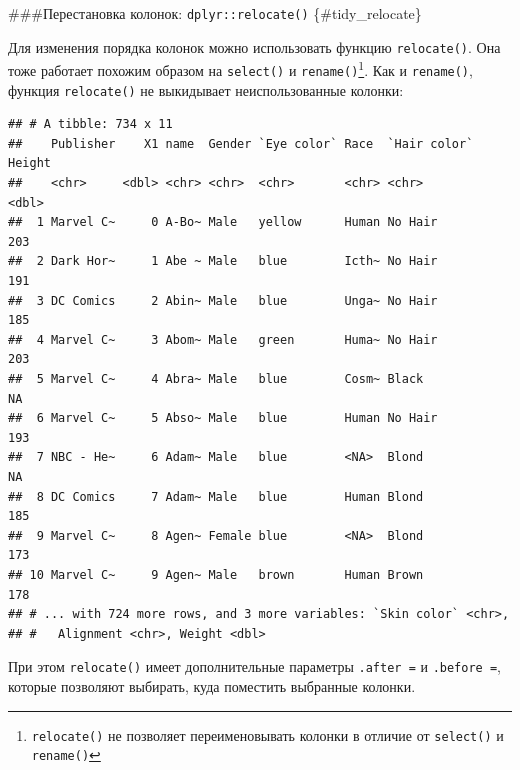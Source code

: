 \documentclass[
]{book}
\newenvironment{Shaded}{\begin{snugshade}}{\end{snugshade}}
\newcommand{\DataTypeTok}[1]{\textcolor[rgb]{0.13,0.29,0.53}{#1}}
\newcommand{\KeywordTok}[1]{\textcolor[rgb]{0.13,0.29,0.53}{\textbf{#1}}}
\newcommand{\NormalTok}[1]{#1}
\newcommand{\OperatorTok}[1]{\textcolor[rgb]{0.81,0.36,0.00}{\textbf{#1}}}
\newcommand{\StringTok}[1]{\textcolor[rgb]{0.31,0.60,0.02}{#1}}
\begin{document}
\#\#\#Перестановка колонок: \texttt{dplyr::relocate()} \{\#tidy\_relocate\}

Для изменения порядка колонок можно использовать функцию \texttt{relocate()}. Она тоже работает похожим образом на \texttt{select()} и \texttt{rename()}\footnote{\texttt{relocate()} не позволяет переименовывать колонки в отличие от \texttt{select()} и \texttt{rename()}}. Как и \texttt{rename()}, функция \texttt{relocate()} не выкидывает неиспользованные колонки:

\begin{Shaded}
\end{Shaded}

\begin{verbatim}
## # A tibble: 734 x 11
##    Publisher    X1 name  Gender `Eye color` Race  `Hair color` Height
##    <chr>     <dbl> <chr> <chr>  <chr>       <chr> <chr>         <dbl>
##  1 Marvel C~     0 A-Bo~ Male   yellow      Human No Hair         203
##  2 Dark Hor~     1 Abe ~ Male   blue        Icth~ No Hair         191
##  3 DC Comics     2 Abin~ Male   blue        Unga~ No Hair         185
##  4 Marvel C~     3 Abom~ Male   green       Huma~ No Hair         203
##  5 Marvel C~     4 Abra~ Male   blue        Cosm~ Black            NA
##  6 Marvel C~     5 Abso~ Male   blue        Human No Hair         193
##  7 NBC - He~     6 Adam~ Male   blue        <NA>  Blond            NA
##  8 DC Comics     7 Adam~ Male   blue        Human Blond           185
##  9 Marvel C~     8 Agen~ Female blue        <NA>  Blond           173
## 10 Marvel C~     9 Agen~ Male   brown       Human Brown           178
## # ... with 724 more rows, and 3 more variables: `Skin color` <chr>,
## #   Alignment <chr>, Weight <dbl>
\end{verbatim}

При этом \texttt{relocate()} имеет дополнительные параметры \texttt{.after\ =} и \texttt{.before\ =}, которые позволяют выбирать, куда поместить выбранные колонки.

\begin{Shaded}
\end{Shaded}
\end{document}
